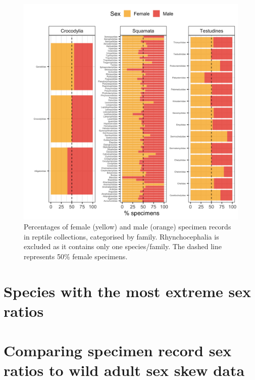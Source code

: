 \documentclass[a4paper, 12pt]{article}
\begin{document}
\begin{figure}[H]
 \centering
  \includegraphics[width = \linewidth]{figures/all-family-reptiles.png}
  \caption{Percentages of female (yellow) and male (orange) specimen records in reptile collections, categorised by family. Rhynchocephalia is excluded as it contains only one species/family. 
  The dashed line represents 50\% female specimens.}
  \label{fig-reptile-family}
\end{figure}

\newpage
\section{Species with the most extreme sex ratios}





\newpage
\section{Comparing specimen record sex ratios to wild adult sex skew data}
\end{document}
